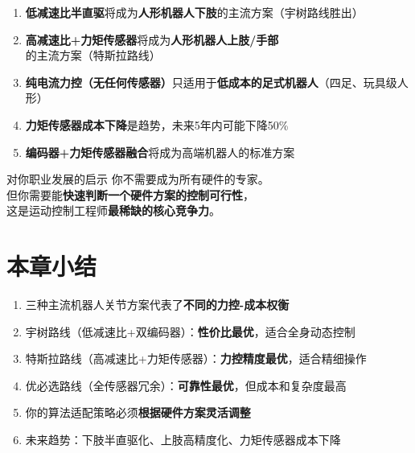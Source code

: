 \begin{enumerate}
  \item \textbf{低减速比半直驱}将成为\textbf{人形机器人下肢}的主流方案（宇树路线胜出）
  \item \textbf{高减速比+力矩传感器}将成为\textbf{人形机器人上肢/手部}的主流方案（特斯拉路线）
  \item \textbf{纯电流力控（无任何传感器）}只适用于\textbf{低成本的足式机器人}（四足、玩具级人形）
  \item \textbf{力矩传感器成本下降}是趋势，未来5年内可能下降50\%
  \item \textbf{编码器+力矩传感器融合}将成为高端机器人的标准方案
\end{enumerate}

\begin{keyinsight}{对你职业发展的启示}
你不需要成为所有硬件的专家。\\
但你需要能\textbf{快速判断一个硬件方案的控制可行性}，\\
这是运动控制工程师\textbf{最稀缺的核心竞争力}。
\end{keyinsight}

\section*{本章小结}

\begin{summarybox}{}
\begin{enumerate}
  \item 三种主流机器人关节方案代表了\textbf{不同的力控-成本权衡}
  \item 宇树路线（低减速比+双编码器）：\textbf{性价比最优}，适合全身动态控制
  \item 特斯拉路线（高减速比+力矩传感器）：\textbf{力控精度最优}，适合精细操作
  \item 优必选路线（全传感器冗余）：\textbf{可靠性最优}，但成本和复杂度最高
  \item 你的算法适配策略必须\textbf{根据硬件方案灵活调整}
  \item 未来趋势：下肢半直驱化、上肢高精度化、力矩传感器成本下降
\end{enumerate}
\end{summarybox}

\newpage
